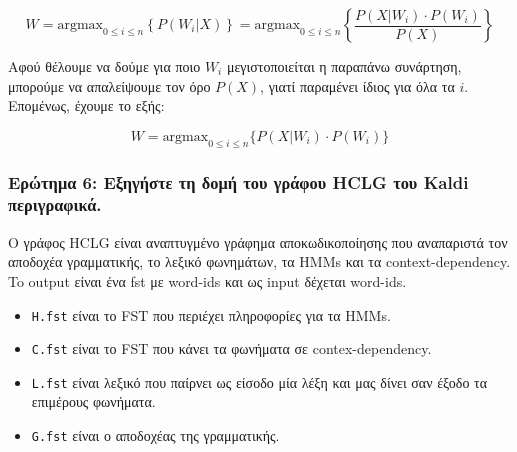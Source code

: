 \documentclass[a4paper, 12pt]{article}
\begin{document}
        \[
            W = \text{argmax}_{0 \leq i \leq n}\left\{{P(W_i|X)}\right\} = \text{argmax}_{0 \leq i \leq n}\left\{\frac{P(X|W_i)\cdot P(W_i)}{P(X)} \right\}
        \]
    
        Αφού θέλουμε να δούμε για ποιο $W_i$ μεγιστοποιείται η παραπάνω συνάρτηση, μπορούμε να απαλείψουμε τον όρο $P(X)$, γιατί παραμένει ίδιος για όλα τα $i$. Επομένως, έχουμε το εξής:
        
        \[
            W = \text{argmax}_{0 \leq i \leq n} \{P(X|W_i)\cdot P(W_i)\}
        \]
    
        \subsubsection*{Ερώτημα 6: Εξηγήστε τη δομή του γράφου HCLG του Kaldi περιγραφικά.}
    
        O γράφος HCLG είναι αναπτυγμένο γράφημα αποκωδικοποίησης που αναπαριστά τον αποδοχέα γραμματικής, το λεξικό φωνημάτων, τα ΗΜΜs και τα context-dependency. To output είναι ένα fst με word-ids και ως input δέχεται word-ids.
    
        \begin{itemize} 
            \item \verb|Η.fst| είναι το FST που περιέχει πληροφορίες για τα HMMs.
            \item \verb|C.fst| είναι το FST που κάνει τα φωνήματα σε contex-dependency. 
            \item \verb|L.fst| είναι λεξικό που παίρνει ως είσοδο μία λέξη και μας δίνει σαν έξοδο τα επιμέρους φωνήματα. 
            \item \verb|G.fst| είναι ο αποδοχέας της γραμματικής.          
        \end{itemize}
\end{document}

